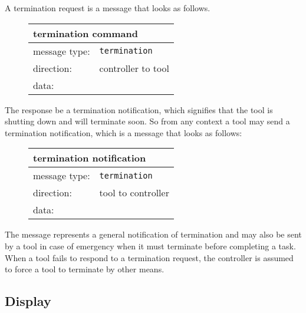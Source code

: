 \documentclass{article}
\newcommand{\msg}[1]{\texttt{#1}}
\begin{document}
   \noindent A termination request is a message that looks as follows.

   \begin{figure}[H]
    \begin{center}
     \begin{tabular}{|ll|}
      \hline
       \multicolumn{2}{|l|}{\textbf{termination command}} \\
      \hline
       message type:    & \msg{termination} \\
      \hline
       direction:       & controller to tool \\
       data:            & \\
      \hline
     \end{tabular}
    \end{center}
   \end{figure}
   \vspace{-0.4cm}

   \noindent The response be a termination notification, which signifies that
   the tool is shutting down and will terminate soon.  So from any context a
   tool may send a termination notification, which is a message that looks as
   follows:

   \begin{figure}[H]
    \begin{center}
     \begin{tabular}{|ll|}
      \hline
       \multicolumn{2}{|l|}{\textbf{termination notification}} \\
      \hline
       message type:   & \msg{termination} \\
      \hline
       direction:      & tool to controller \\
       data:           & \\
      \hline
     \end{tabular}
    \end{center}
   \end{figure}
   \vspace{-0.4cm}

   \noindent The message represents a general notification of termination and
   may also be sent by a tool in case of emergency when it must terminate
   before completing a task. When a tool fails to respond to a termination
   request, the controller is assumed to force a tool to terminate by other
   means.

  \subsection{Display} \label{ss:user_interaction}
\end{document}
